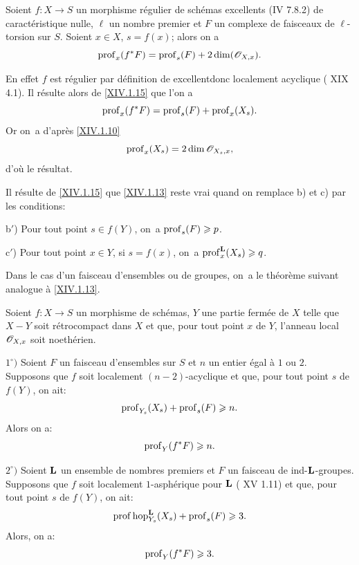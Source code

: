\begin{corollaire} \label{XIV.1.16}
Soient $f:X\to S$ un morphisme r\'egulier de sch\'emas excellents (\textup{\EGA IV 7.8.2}) de caract\'eristique nulle, $\ell$ un nombre premier et $F$ un complexe de faisceaux de $\ell$-torsion sur $S$. Soient $x\in X$, $s=f(x)$; alors on a
$$
\operatorname{prof}_x(f^*F)=\operatorname{prof}_s(F)+2\dim({\mathscr O}_{X, x}).
$$
\end{corollaire}

En effet $f$ est r\'egulier par d\'efinition de \og excellent\fg donc localement acyclique ( XIX 4.1). Il r\'esulte alors de \ref{XIV.1.15} que l'on a
$$
\operatorname{prof}_x(f^*F)=\operatorname{prof}_s(F)+\operatorname{prof}_x(X_s).
$$
Or on~a d'apr\`es \ref{XIV.1.10}
$$
\operatorname{prof}_x(X_s)=2\dim{\mathscr O}_{X_s, x},
$$
d'o\`u le r\'esultat.

\begin{remarque} \label{XIV.1.17}
Il r\'esulte de \ref{XIV.1.15} que \ref{XIV.1.13} reste vrai quand on remplace b) et c) par les conditions:

b$'$) Pour tout point $s\in f(Y)$, on~a $\operatorname{prof}_s(F)\geqslant p$.

c$'$) Pour tout point $x\in Y$, si $s=f(x)$, on~a $\operatorname{prof}^{\mathbf{L}}_x(X_s)\geqslant q$.
\end{remarque}

Dans le cas d'un faisceau d'ensembles ou de groupes, on~a le th\'eor\`eme suivant analogue \`a \ref{XIV.1.13}.

\begin{theoreme} \label{XIV.1.18}
Soient $f:X\to S$ un morphisme de sch\'emas, $Y$ une partie ferm\'ee de $X$ telle que $X-Y$ soit r\'etrocompact dans $X$ et que, pour tout point $x$ de $Y$, l'anneau local ${\mathscr O}_{X, x}$ soit noeth\'erien.

$1^\circ)$ Soient $F$ un faisceau d'ensembles sur $S$ et $n$ un entier \'egal \`a $1$ ou $2$. Supposons que $f$ soit localement $(n-2)$-acyclique et que, pour tout point $s$ de $f(Y)$, on ait:
$$
\operatorname{prof}_{Y_s}(X_s)+\operatorname{prof}_s(F)\geqslant n.
$$
Alors on a:$$
\operatorname{prof}_Y(f^*F)\geqslant n.
$$

$2^\circ)$ Soient $\mathbf{L}$ un ensemble de nombres premiers et $F$ un faisceau de ind-$\mathbf{L}$-groupes. Supposons que $f$ soit localement $1$-asph\'erique pour $\mathbf{L}$ (\textup{ XV 1.11}) et que, pour tout point $s$ de $f(Y)$, on ait:
$$
\operatorname{prof}\operatorname{hop}^{\mathbf{L}}_{Y_s}(X_s)+\operatorname{prof}_s(F)\geqslant 3.
$$
Alors, on a:$$
\operatorname{prof}_Y(f^*F)\geqslant 3.
$$
\end{theoreme}

